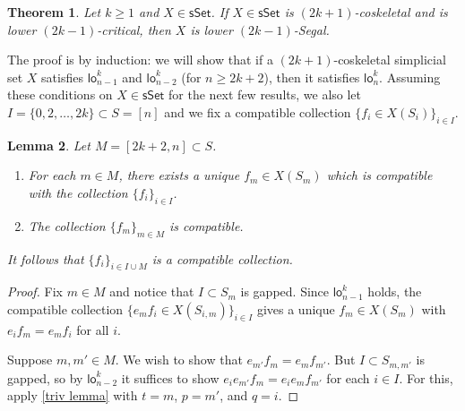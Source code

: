\documentclass{amsart}
\newcommand{\lowod}{\mathsf{lo}}
\newcommand{\sset}{\mathsf{sSet}}
\newtheorem{theorem}{Theorem}
\newtheorem{lemma}[theorem]{Lemma}
\theoremstyle{definition}
\theoremstyle{remark}
\begin{document}
\begin{theorem}\label{thm lowod case coskel to segal}
Let $k \geq 1$ and $X\in \sset$.
If $X\in\sset$ is $(2k{+}1)$-coskeletal 
and is lower $(2k{-}1)$-critical, 
then $X$ is lower $(2k{-}1)$-Segal.
\end{theorem}

The proof is by induction: we will show that if a $(2k{+}1)$-coskeletal simplicial set $X$ satisfies $\lowod_{n-1}^k$ and $\lowod_{n-2}^k$ (for $n\geq 2k+2$), then it satisfies $\lowod_n^k$.
Assuming these conditions on $X \in \sset$ for the next few results, we also let $I= \{0, 2, \dots, 2k\} \subset S = [n]$ and we fix a compatible collection $\{f_i \in X(S_i)\}_{i\in I}$.

\begin{lemma}\label{lem end expansion}
Let $M = [2k+2, n] \subset S$.
\begin{enumerate}
\item For each $m\in M$, there exists a unique $f_m \in X(S_m)$ which is compatible with the collection $\{f_i\}_{i\in I}$.
\item The collection $\{f_m\}_{m\in M}$ is compatible.
\end{enumerate}
It follows that $\{f_i\}_{i \in I \cup M}$ is a compatible collection.
\end{lemma}
\begin{proof}
Fix $m\in M$ and notice that $I\subset S_m$ is gapped. Since $\lowod_{n-1}^k$ holds, the compatible collection $\{e_m f_i \in X(S_{i,m}) \}_{i\in I}$ gives a unique $f_m \in X(S_m)$ with $e_i f_m = e_m f_i$ for all $i$.

Suppose $m,m' \in M$. We wish to show that $e_{m'} f_m = e_m f_{m'}$.
But $I\subset S_{m,m'}$ is gapped, so by $\lowod_{n-2}^k$ it suffices to show $e_i e_{m'} f_m = e_i e_m f_{m'}$ for each $i\in I$.
For this, apply \cref{triv lemma} with $t=m$, $p=m'$, and $q=i$.
\end{proof}
\end{document}
